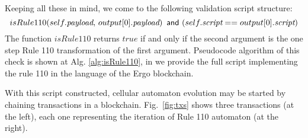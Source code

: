 \documentclass[runningheads]{llncs}
\newcommand{\payload}{\textit{payload}}
\newcommand{\script}{\textit{script}}
\newcommand{\And}{\textsf{ and }}
\begin{document}
    Keeping all these in mind, we come to the following validation
    script structure:
    \begin{equation}
        \label{eq:script}
        isRule110(self.\payload{},\, output[0].\payload{})\, \And\, \\
        (self.\script{} == output[0].\script{})
    \end{equation}
    The function $isRule110$ returns $true$ if and only if the second argument
    is the one step Rule 110 transformation of the first argument.
    Pseudocode algorithm of this check is shown at Alg. \ref{alg:isRule110}, in
     we provide the full script implementing the rule 110 in
    the language of the Ergo blockchain.
    

    With this script constructed, cellular automaton evolution may be started by
    chaining transactions in a blockchain. Fig.~\ref{fig:txs} shows three
    transactions (at the left), each one representing the iteration of Rule 110
    automaton (at the right).
\end{document}
